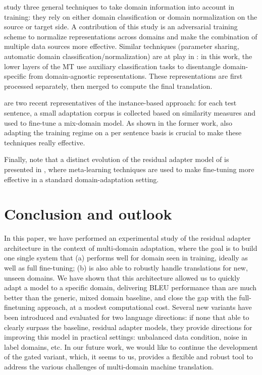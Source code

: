 \documentclass[11pt,a4paper]{article}
\newcommand{\mpDone}[1]{\done[MP]\Todo[MP:]{\textcolor{green}{#1}}}
\begin{document}
\citet{Britz17mixing} study three general techniques to take domain information into account in training: they rely on either domain classification or domain normalization on the source or target side. A contribution of this study is an adversarial training scheme to normalize representations across domains and make the combination of multiple data sources more effective. Similar techniques (parameter sharing, automatic domain classification/normalization) are at play in \citet{Zeng18multidomain}: in this work, the lower layers of the MT use auxiliary classification tasks to disentangle domain-specific from domain-agnostic representations. These representations are first processed separately, then merged to compute the final translation.

\citet{Farajian17multidomain,li-etal-2018-one} are two recent representatives of the instance-based approach: for each test sentence, a small adaptation corpus is collected based on similarity measures and used to fine-tune a mix-domain model. As shown in the former work, also adapting the training regime on a per sentence basis is crucial to make these techniques really effective. 

Finally, note that a distinct evolution of the residual adapter model of \citet{Bapna19simple} is presented in \citep{Sharaf20metalearning}, where meta-learning techniques are used to make fine-tuning more effective in a standard domain-adaptation setting.

\section{Conclusion and outlook \label{sec:discussion}}
\mpDone{discussion}
In this paper, we have performed an experimental study of the residual adapter architecture in the context of multi-domain adaptation, where the goal is to build one single system that (a) performs well for domain seen in training, ideally as well as full fine-tuning; (b) is also able to robustly handle translations for new, unseen domains. We have shown that this architecture allowed us to quickly adapt a model to a specific domain, delivering BLEU performance than are much better than the generic, mixed domain baseline, and close the gap with the full-finetuning approach, at a modest computational cost. Several new variants have been introduced and evaluated for two language directions: if none that able to clearly surpass the baseline, residual adapter models, they provide directions for improving this model in practical settings: unbalanced data condition, noise in label domains, etc. In our future work, we would like to continue the development of the gated variant, which, it seems to us, provides a flexible and robust tool to address the various challenges of multi-domain machine translation.
\end{document}
